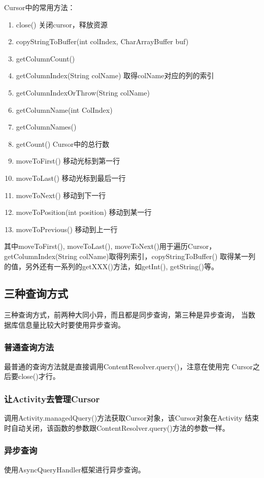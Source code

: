 Cursor中的常用方法：

\begin{enumerate}
\item close() 关闭cursor，释放资源
\item copyStringToBuffer(int colIndex, CharArrayBuffer buf)
\item getColumnCount()
\item getColumnIndex(String colName) 取得colName对应的列的索引
\item getColumnIndexOrThrow(String colName)
\item getColumnName(int ColIndex)
\item getColumnNames()
\item getCount() Cursor中的总行数
\item moveToFirst() 移动光标到第一行
\item moveToLast() 移动光标到最后一行
\item moveToNext() 移动到下一行
\item moveToPosition(int position) 移动到某一行
\item moveToPrevious() 移动到上一行
\end{enumerate}

其中moveToFirst(), moveToLast(), moveToNext()用于遍历Cursor，
getColumnIndex(String colName)取得列索引，copyStringToBuffer()
取得某一列的值，另外还有一系列的getXXX()方法，如getInt(), getString()等。

\subsection[三种查询方式]{三种查询方式}
三种查询方式，前两种大同小异，而且都是同步查询，第三种是异步查询，
当数据库信息量比较大时要使用异步查询。

\subsubsection[普通查询方法]{普通查询方法}
最普通的查询方法就是直接调用ContentResolver.query()，注意在使用完
Cursor之后要close()才行。

\subsubsection[让Activity去管理Cursor]{让Activity去管理Cursor}
调用Activity.managedQuery()方法获取Cursor对象，该Cursor对象在Activity
结束时自动关闭，该函数的参数跟ContentResolver.query()方法的参数一样。

\subsubsection[异步查询]{异步查询}
使用AsyncQueryHandler框架进行异步查询。

